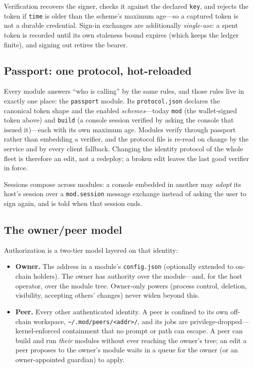 \documentclass[11pt,a4paper]{article}
\begin{document}
Verification recovers the signer, checks it against the declared \texttt{key},
and rejects the token if \texttt{time} is older than the scheme's maximum
age---so a captured token is not a durable credential. Sign-in exchanges are
additionally \emph{single-use}: a spent token is recorded until its own
staleness bound expires (which keeps the ledger finite), and signing out
retires the bearer.

\subsection{Passport: one protocol, hot-reloaded}

Every module answers ``who is calling'' by the same rules, and those rules
live in exactly one place: the \texttt{passport} module. Its
\texttt{protocol.json} declares the canonical token shape and the enabled
\emph{schemes}---today \texttt{mod} (the wallet-signed token above) and
\texttt{build} (a console session verified by asking the console that issued
it)---each with its own maximum age. Modules verify through passport rather
than embedding a verifier, and the protocol file is re-read on change by the
service and by every client fallback. Changing the identity protocol of the
whole fleet is therefore an edit, not a redeploy; a broken edit leaves the last
good verifier in force.

Sessions compose across modules: a console embedded in another may
\emph{adopt} its host's session over a \texttt{mod.session} message exchange
instead of asking the user to sign again, and is told when that session ends.

\subsection{The owner/peer model}

Authorization is a two-tier model layered on that identity:

\begin{itemize}
    \item \textbf{Owner.} The address in a module's \texttt{config.json}
    (optionally extended to on-chain holders). The owner has authority over the
    module---and, for the host operator, over the module tree. Owner-only
    powers (process control, deletion, visibility, accepting others' changes)
    never widen beyond this.
    \item \textbf{Peer.} Every other authenticated identity. A peer is confined
    to its own off-chain workspace,
    \texttt{\textasciitilde/.mod/peers/<addr>/}, and its jobs are
    privilege-dropped---kernel-enforced containment that no prompt or path can
    escape. A peer can build and run \emph{their} modules without ever reaching
    the owner's tree; an edit a peer proposes to the owner's module waits in a
    queue for the owner (or an owner-appointed guardian) to apply.
\end{itemize}
\end{document}
